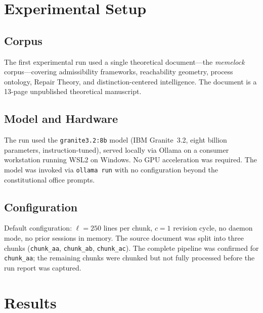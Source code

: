 \documentclass[12pt, a4paper]{article}
\theoremstyle{principle}
\theoremstyle{definition}
\begin{document}
\section{Experimental Setup}
\label{sec:experiment}

\subsection{Corpus}

The first experimental run used a single theoretical document---the
\emph{memelock} corpus---covering admissibility frameworks, reachability geometry,
process ontology, Repair Theory, and distinction-centered intelligence. The document
is a 13-page unpublished theoretical manuscript.

\subsection{Model and Hardware}

The run used the \texttt{granite3.2:8b} model (IBM Granite~3.2, eight billion
parameters, instruction-tuned), served locally via Ollama on a consumer workstation
running WSL2 on Windows. No GPU acceleration was required. The model was invoked via
\texttt{ollama run} with no configuration beyond the constitutional office prompts.

\subsection{Configuration}

Default configuration: $\ell = 250$ lines per chunk, $c = 1$ revision cycle,
no daemon mode, no prior sessions in memory. The source document was split into
three chunks (\texttt{chunk\_aa}, \texttt{chunk\_ab}, \texttt{chunk\_ac}).
The complete pipeline was confirmed for \texttt{chunk\_aa}; the remaining chunks
were chunked but not fully processed before the run report was captured.

\section{Results}
\label{sec:results}
\end{document}
